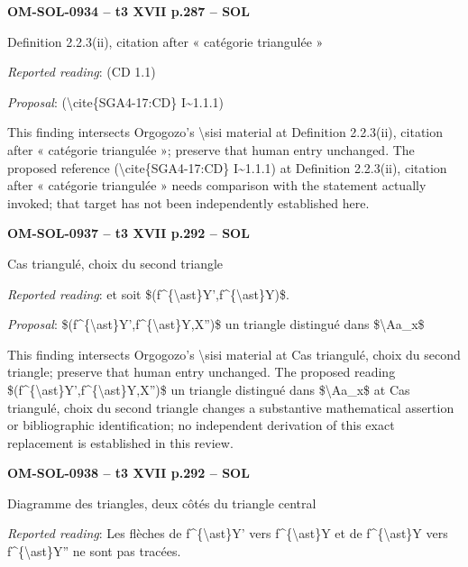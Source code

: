 \par\noindent\textbf{OM-SOL-0934 -- t3 XVII p.287 -- SOL}\par
Definition 2.2.3(ii), citation after « catégorie triangulée »\par
\emph{Reported reading}: (CD 1.1)\par
\emph{Proposal}: (\textbackslash{}cite\{SGA4-17:CD\} I\textasciitilde{}1.1.1)\par
This finding intersects Orgogozo's \textbackslash{}sisi material at Definition 2.2.3(ii), citation after « catégorie triangulée »; preserve that human entry unchanged. The proposed reference (\textbackslash{}cite\{SGA4-17:CD\} I\textasciitilde{}1.1.1) at Definition 2.2.3(ii), citation after « catégorie triangulée » needs comparison with the statement actually invoked; that target has not been independently established here.\par
\par\noindent\textbf{OM-SOL-0937 -- t3 XVII p.292 -- SOL}\par
Cas triangulé, choix du second triangle\par
\emph{Reported reading}: et soit \$(f\textasciicircum{}\{\textbackslash{}ast\}Y',f\textasciicircum{}\{\textbackslash{}ast\}Y)\$.\par
\emph{Proposal}: \$(f\textasciicircum{}\{\textbackslash{}ast\}Y',f\textasciicircum{}\{\textbackslash{}ast\}Y,X'')\$ un triangle distingué dans \$\textbackslash{}Aa\_x\$\par
This finding intersects Orgogozo's \textbackslash{}sisi material at Cas triangulé, choix du second triangle; preserve that human entry unchanged. The proposed reading \$(f\textasciicircum{}\{\textbackslash{}ast\}Y',f\textasciicircum{}\{\textbackslash{}ast\}Y,X'')\$ un triangle distingué dans \$\textbackslash{}Aa\_x\$ at Cas triangulé, choix du second triangle changes a substantive mathematical assertion or bibliographic identification; no independent derivation of this exact replacement is established in this review.\par
\par\noindent\textbf{OM-SOL-0938 -- t3 XVII p.292 -- SOL}\par
Diagramme des triangles, deux côtés du triangle central\par
\emph{Reported reading}: Les flèches de f\textasciicircum{}\{\textbackslash{}ast\}Y' vers f\textasciicircum{}\{\textbackslash{}ast\}Y et de f\textasciicircum{}\{\textbackslash{}ast\}Y vers f\textasciicircum{}\{\textbackslash{}ast\}Y'' ne sont pas tracées.\par
